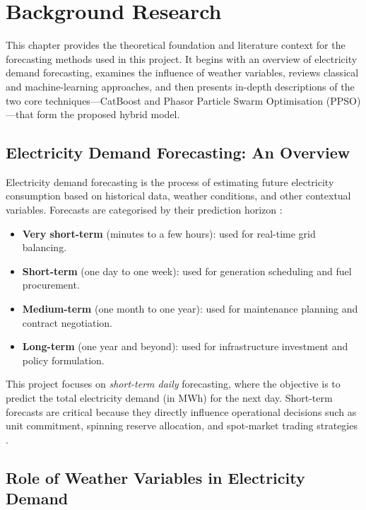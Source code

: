 \chapter{Background Research}\label{ch:Background}

This chapter provides the theoretical foundation and literature context for the forecasting methods used in this project. It begins with an overview of electricity demand forecasting, examines the influence of weather variables, reviews classical and machine-learning approaches, and then presents in-depth descriptions of the two core techniques---CatBoost and Phasor Particle Swarm Optimisation (PPSO)---that form the proposed hybrid model.


\section{Electricity Demand Forecasting: An Overview}

Electricity demand forecasting is the process of estimating future electricity consumption based on historical data, weather conditions, and other contextual variables. Forecasts are categorised by their prediction horizon \parencite{amasyali2018review}:

\begin{itemize}
    \item \textbf{Very short-term} (minutes to a few hours): used for real-time grid balancing.
    \item \textbf{Short-term} (one day to one week): used for generation scheduling and fuel procurement.
    \item \textbf{Medium-term} (one month to one year): used for maintenance planning and contract negotiation.
    \item \textbf{Long-term} (one year and beyond): used for infrastructure investment and policy formulation.
\end{itemize}

This project focuses on \emph{short-term daily} forecasting, where the objective is to predict the total electricity demand (in MWh) for the next day. Short-term forecasts are critical because they directly influence operational decisions such as unit commitment, spinning reserve allocation, and spot-market trading strategies \parencite{akay2007grey}.


\section{Role of Weather Variables in Electricity Demand}

